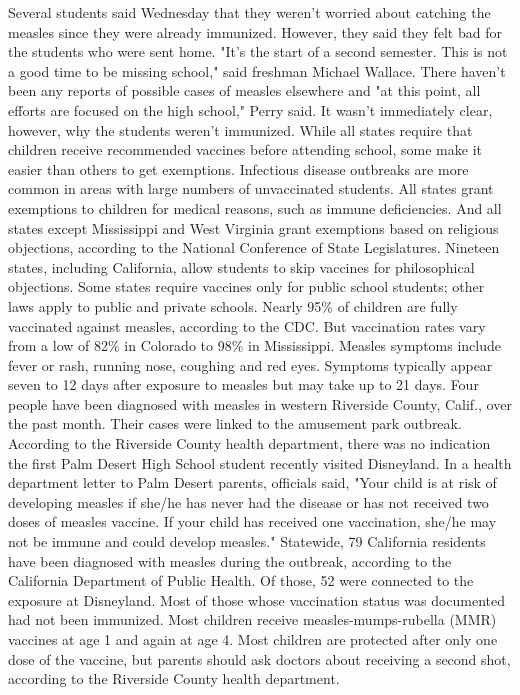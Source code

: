 \documentclass[a4paper,12pt]{article}
\begin{document}
\begin{appendices}
Several students said Wednesday that they weren't worried about catching the measles since they were already immunized. However, they said they felt bad for the students who were sent home.
"It's the start of a second semester. This is not a good time to be missing school," said freshman Michael Wallace.
There haven't been any reports of possible cases of measles elsewhere and "at this point, all efforts are focused on the high school," Perry said.
It wasn't immediately clear, however, why the students weren't immunized.
While all states require that children receive recommended vaccines before attending school, some make it easier than others to get exemptions. Infectious disease outbreaks are more common in areas with large numbers of unvaccinated students.
All states grant exemptions to children for medical reasons, such as immune deficiencies. And all states except Mississippi and West Virginia grant exemptions based on religious objections, according to the National Conference of State Legislatures.
Nineteen states, including California, allow students to skip vaccines for philosophical objections. Some states require vaccines only for public school students; other laws apply to public and private schools.
Nearly 95\% of children are fully vaccinated against measles, according to the CDC. But vaccination rates vary from a low of 82\% in Colorado to 98\% in Mississippi.
Measles symptoms include fever or rash, running nose, coughing and red eyes. Symptoms typically appear seven to 12 days after exposure to measles but may take up to 21 days.
Four people have been diagnosed with measles in western Riverside County, Calif., over the past month. Their cases were linked to the amusement park outbreak.
According to the Riverside County health department, there was no indication the first Palm Desert High School student recently visited Disneyland.
In a health department letter to Palm Desert parents, officials said, "Your child is at risk of developing measles if she/he has never had the disease or has not received two doses of measles vaccine. If your child has received one vaccination, she/he may not be immune and could develop measles."
Statewide, 79 California residents have been diagnosed with measles during the outbreak, according to the California Department of Public Health. Of those, 52 were connected to the exposure at Disneyland. Most of those whose vaccination status was documented had not been immunized.
Most children receive measles-mumps-rubella (MMR) vaccines at age 1 and again at age 4. Most children are protected after only one dose of the vaccine, but parents should ask doctors about receiving a second shot, according to the Riverside County health department.

\end{appendices}
\end{document}
